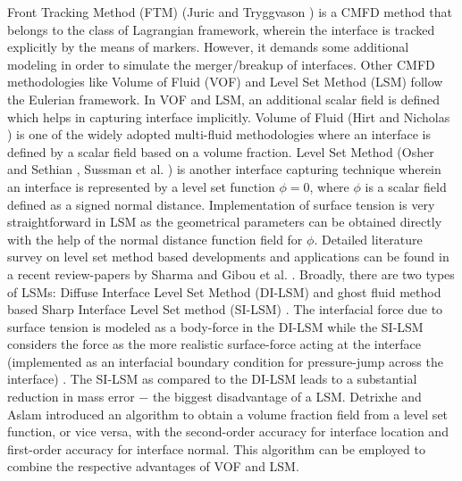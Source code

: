 \documentclass[preprint,12pt]{elsarticle}
\begin{document}
Front Tracking Method (FTM) (Juric and Tryggvason \cite{Juric1996})
is a CMFD method that belongs to the class of Lagrangian framework,
wherein the interface is tracked explicitly by the means of markers. However,
it demands some additional modeling in order to simulate the merger/breakup
of interfaces. Other CMFD methodologies like Volume of Fluid (VOF)
and Level Set Method (LSM) follow  the Eulerian framework. In VOF
and LSM, an additional scalar field is defined which helps in capturing
interface implicitly. Volume of Fluid (Hirt and Nicholas \cite{Hirt1981})
is one of the widely adopted multi-fluid methodologies where an interface
is defined by a scalar field  based on a volume fraction. Level Set Method (Osher
and Sethian \cite{Osher1988}, Sussman et al. \cite{sussman1994}) is another
interface capturing technique wherein an interface is represented
by a level set function $\phi=0$, where $\phi$ is a scalar field
defined as a signed normal distance. Implementation of surface tension
is very straightforward in LSM as the geometrical parameters can be
obtained directly with the help of the normal distance function field
for $\phi$. Detailed literature survey on level set method based
developments and applications can be found in a recent review-papers
by Sharma \cite{shrma2015} and Gibou et al. \cite{gibou2018}. Broadly,
there are two types of LSMs: Diffuse Interface Level Set Method (DI-LSM)
\cite{sussman1994} and ghost fluid method based Sharp Interface Level
Set method (SI-LSM) \cite{fedkiw1999}. The interfacial force due to surface
tension is modeled as a body-force in the DI-LSM while the SI-LSM
considers the force as the more realistic surface-force acting at
the interface (implemented as an interfacial boundary condition for
pressure-jump across the interface) \cite{shaikh2018}. The SI-LSM as compared to the DI-LSM leads to a substantial reduction in mass error \cite{shaikh2018} $-$ the biggest disadvantage of a LSM. Detrixhe and Aslam \cite{detrixhe2015} introduced an algorithm to obtain a volume fraction field from a level set function, or vice versa, with the second-order accuracy for interface location and first-order accuracy for interface normal. This algorithm can be employed to combine the respective advantages of VOF and LSM.

\end{document}
